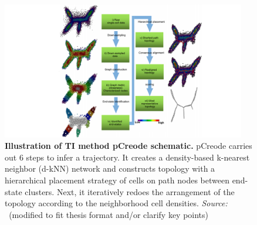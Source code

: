 \begin{figure}[ht!]
	\centering
	\includegraphics[width=0.95\textwidth]{TI_Alg_pCreode/fig}
	\vspace{0.1cm}
	\caption[Illustration of TI method pCreode schematic.]{\textbf{Illustration of TI method pCreode schematic.} pCreode carries out 6 steps to infer a trajectory. It creates a density-based k-nearest neighbor (d-kNN) network and constructs topology with a hierarchical placement strategy of cells on path nodes between end-state clusters. Next, it iteratively redoes the arrangement of the topology according to the neighborhood cell densities. \emph{Source: ~\cite{herring2018pCreode}}(modified to fit thesis format and/or clarify key points)
	}
	\label{fig:TI_Alg_pCreode}
\end{figure}

